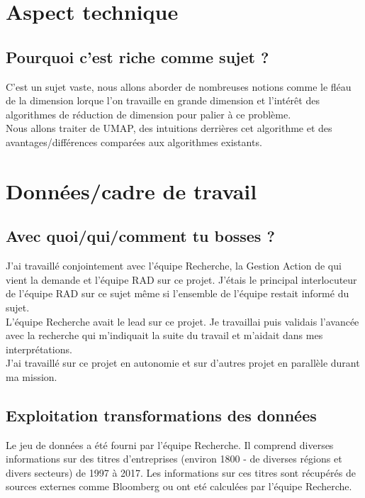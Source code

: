 \section{Aspect technique}

\subsection{Pourquoi c'est riche comme sujet ?}
C'est un sujet vaste, nous allons aborder de nombreuses notions comme le fléau de la dimension lorque l'on travaille en grande dimension et l'intérêt des algorithmes de réduction de dimension pour palier à ce problème.
\\
Nous allons traiter de UMAP, des intuitions derrières cet algorithme et des avantages/différences comparées aux algorithmes existants.


\section{Données/cadre de travail}

\subsection{Avec quoi/qui/comment tu bosses ?}
J'ai travaillé conjointement avec l'équipe Recherche, la Gestion Action de qui vient la demande et l'équipe RAD sur ce projet. J'étais le principal interlocuteur de l'équipe RAD sur ce sujet même si l'ensemble de l'équipe restait informé du sujet. 
\\
L'équipe Recherche avait le lead sur ce projet. Je travaillai puis validais l'avancée avec la recherche qui m'indiquait la suite du travail et m'aidait dans mes interprétations.
\\
J'ai travaillé sur ce projet en autonomie et sur d'autres projet en parallèle durant ma mission. 

\subsection{Exploitation transformations des données}
Le jeu de données a été fourni par l'équipe Recherche. Il comprend diverses informations sur des titres d'entreprises (environ 1800 - de diverses régions et divers secteurs) de 1997 à 2017. Les informations sur ces titres sont récupérés de sources externes comme Bloomberg ou ont eté calculées par l'équipe Recherche.